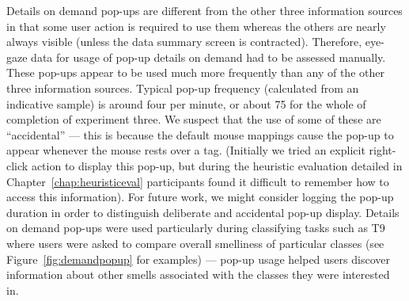 Details on demand pop-ups are different from the other three information sources in that some user action is required to use them whereas the others are nearly always visible (unless the data summary screen is contracted). Therefore, eye-gaze data for usage of pop-up details on demand had to be assessed manually. These pop-ups appear to be used much more frequently than any of the other three information sources.  Typical pop-up frequency (calculated from an indicative sample) is around four per minute, or about 75 for the whole of completion of experiment three. We suspect that the use of some of these are ``accidental'' --- this is because the default mouse mappings cause the pop-up to appear whenever the mouse rests over a tag.  (Initially we tried an explicit right-click action to display this pop-up, but during the heuristic evaluation detailed in Chapter~\ref{chap:heuristiceval} participants found it difficult to remember how to access this information).  For future work, we might consider logging the pop-up duration in order to distinguish deliberate and accidental pop-up display. Details on demand pop-ups were used particularly during classifying tasks such as T9 where users were asked to compare overall smelliness of particular classes (see Figure~\vref{fig:demandpopup} for examples) --- pop-up usage helped users discover information about other smells associated with the classes they were interested in.

